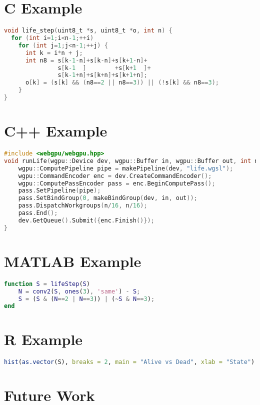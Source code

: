 \documentclass{report}
\begin{document}
\begin{umaappendices}


\section{C Example}
\begin{lstlisting}[language=C,caption={C: Naïve CPU Life Step},label={lst:c-life}]
void life_step(uint8_t *s, uint8_t *o, int n) {
  for (int i=1;i<n-1;++i)
    for (int j=1;j<n-1;++j) {
      int k = i*n + j;
      int n8 = s[k-1-n]+s[k-n]+s[k+1-n]+
               s[k-1  ]        +s[k+1  ]+
               s[k-1+n]+s[k+n]+s[k+1+n];
      o[k] = (s[k] && (n8==2 || n8==3)) || (!s[k] && n8==3);
    }
}
\end{lstlisting}

\section{C++ Example}
\begin{lstlisting}[language=C++,caption={C++17: Dispatching a WGSL Shader},label={lst:cpp-dispatch}]
#include <webgpu/webgpu.hpp>
void runLife(wgpu::Device dev, wgpu::Buffer in, wgpu::Buffer out, int n) {
    wgpu::ComputePipeline pipe = makePipeline(dev, "life.wgsl");
    wgpu::CommandEncoder enc = dev.CreateCommandEncoder();
    wgpu::ComputePassEncoder pass = enc.BeginComputePass();
    pass.SetPipeline(pipe);
    pass.SetBindGroup(0, makeBindGroup(dev, in, out));
    pass.DispatchWorkgroups(n/16, n/16);
    pass.End();
    dev.GetQueue().Submit({enc.Finish()});
}
\end{lstlisting}

\section{MATLAB Example}
\begin{lstlisting}[language=Matlab,caption={MATLAB: Life via Convolution},label={lst:matlab-life}]
function S = lifeStep(S)
    N = conv2(S, ones(3), 'same') - S;
    S = (S & (N==2 | N==3)) | (~S & N==3);
end
\end{lstlisting}

\section{R Example}
\begin{lstlisting}[language=R,caption={R: State Histogram},label={lst:r-hist}]
hist(as.vector(S), breaks = 2, main = "Alive vs Dead", xlab = "State")
\end{lstlisting}

\section{Future Work}
\blindtext[1]
\end{umaappendices}

\backmatter
\printbibliography[title={Bibliography}]
\cleardoublepage
\MakeUMABackCover
\end{document}

